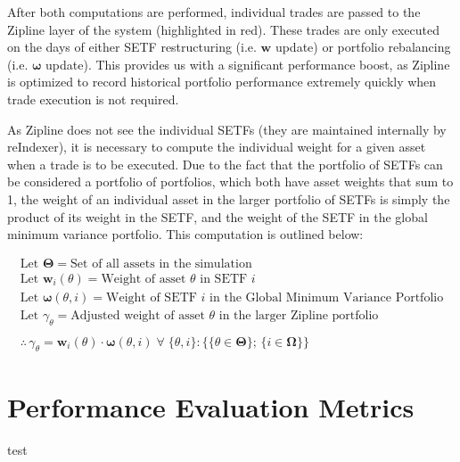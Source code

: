 \documentclass[../main.tex]{subfiles}
\begin{document}
After both computations are performed, individual trades are passed to the Zipline layer of the system (highlighted in red). These trades are only executed on the days of either SETF restructuring (i.e. $\boldsymbol{w}$ update) or portfolio rebalancing (i.e. $\boldsymbol{\omega}$ update). This provides us with a significant performance boost, as Zipline is optimized to record historical portfolio performance extremely quickly when trade execution is not required.

As Zipline does not see the individual SETFs (they are maintained internally by reIndexer), it is necessary to compute the individual weight for a given asset when a trade is to be executed. Due to the fact that the portfolio of SETFs can be considered a portfolio of portfolios, which both have asset weights that sum to 1, the weight of an individual asset in the larger portfolio of SETFs is simply the product of its weight in the SETF, and the weight of the SETF in the global minimum variance portfolio. This computation is outlined below:

\begin{gather*}
    \text{Let $\boldsymbol{\Theta}$} = \text{Set of all assets in the simulation} \\
    \text{Let $\boldsymbol{w}_i(\theta)$} = \text{Weight of asset $\theta$ in SETF $i$} \\
    \text{Let $\boldsymbol{\omega}(\theta, i)$} = \text{Weight of SETF $i$ in the Global Minimum Variance Portfolio} \\
    \text{Let $\gamma_\theta$} = \text{Adjusted weight of asset $\theta$ in the larger Zipline portfolio}
    \\
    \\
    \therefore \, \gamma_\theta = \boldsymbol{w}_i(\theta) \cdot \boldsymbol{\omega}(\theta, i) \; \forall \; \{ \theta, i \} : \{ \{ \theta \in \boldsymbol{\Theta} \} ; \, \{ i \in \boldsymbol{\Omega} \} \}
\end{gather*}



\section{Performance Evaluation Metrics}

test
\end{document}
